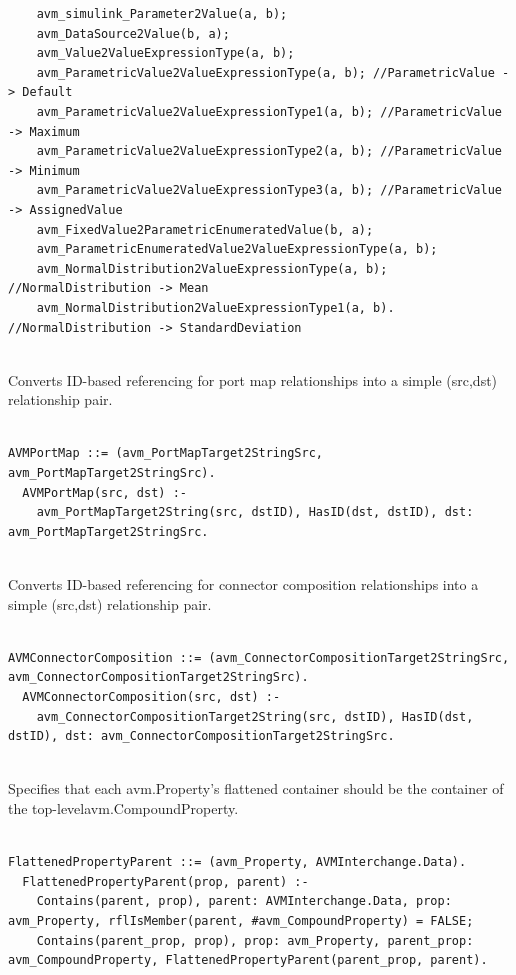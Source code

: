 \begin{lstlisting}
    avm_simulink_Parameter2Value(a, b);
    avm_DataSource2Value(b, a);
    avm_Value2ValueExpressionType(a, b);
    avm_ParametricValue2ValueExpressionType(a, b); //ParametricValue -> Default
    avm_ParametricValue2ValueExpressionType1(a, b); //ParametricValue -> Maximum
    avm_ParametricValue2ValueExpressionType2(a, b); //ParametricValue -> Minimum
    avm_ParametricValue2ValueExpressionType3(a, b); //ParametricValue -> AssignedValue
    avm_FixedValue2ParametricEnumeratedValue(b, a);
    avm_ParametricEnumeratedValue2ValueExpressionType(a, b);
    avm_NormalDistribution2ValueExpressionType(a, b); //NormalDistribution -> Mean
    avm_NormalDistribution2ValueExpressionType1(a, b). //NormalDistribution -> StandardDeviation


\end{lstlisting}

Converts ID-based referencing for port map relationships into a simple (src,dst) relationship pair.
\begin{lstlisting}

AVMPortMap ::= (avm_PortMapTarget2StringSrc, avm_PortMapTarget2StringSrc).
  AVMPortMap(src, dst) :-
    avm_PortMapTarget2String(src, dstID), HasID(dst, dstID), dst: avm_PortMapTarget2StringSrc.


\end{lstlisting}

Converts ID-based referencing for connector composition relationships into a simple (src,dst) relationship pair.
\begin{lstlisting}

AVMConnectorComposition ::= (avm_ConnectorCompositionTarget2StringSrc, avm_ConnectorCompositionTarget2StringSrc).
  AVMConnectorComposition(src, dst) :-
    avm_ConnectorCompositionTarget2String(src, dstID), HasID(dst, dstID), dst: avm_ConnectorCompositionTarget2StringSrc.


\end{lstlisting}

Specifies that each avm.Property's flattened container should be the container of the top-levelavm.CompoundProperty.
\begin{lstlisting}

FlattenedPropertyParent ::= (avm_Property, AVMInterchange.Data).
  FlattenedPropertyParent(prop, parent) :-
    Contains(parent, prop), parent: AVMInterchange.Data, prop: avm_Property, rflIsMember(parent, #avm_CompoundProperty) = FALSE;
    Contains(parent_prop, prop), prop: avm_Property, parent_prop: avm_CompoundProperty, FlattenedPropertyParent(parent_prop, parent).


\end{lstlisting}

